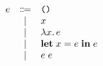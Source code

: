 \documentclass[12pt]{article}
\begin{document}
\pagestyle{empty}

\begin{align*}
    \begin{array}{rcl}
        e
        &\Coloneqq & \text{\texttt{()}} \\
        &\mid & x \\
        &\mid & \lambda x\ldotp e \\
        &\mid & \mathbf{let}\;x = e\;\mathbf{in}\;e \\
        &\mid & e\; e
    \end{array}
\end{align*}
\end{document}
